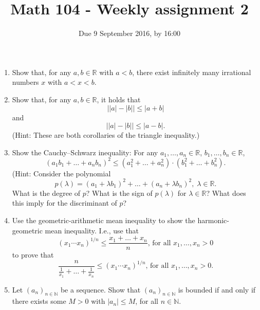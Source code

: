 \documentclass[11pt]{amsart}
\newcommand\R{{\mathbb{R}}}
\newcommand\N{{\mathbb N}}
\theoremstyle{plain}
\theoremstyle{definition}
\numberwithin{equation}{section}
\begin{document}
\title{Math 104 - Weekly assignment 2}
\author{Due 9 September 2016, by 16:00}
\maketitle

\begin{enumerate}
\item Show that, for any $a,b\in\R$ with $a<b$, there exist infinitely many irrational numbers $x$ with $a<x<b$.
\vspace{0.4in}
\item Show that, for any $a, b\in\R$, it holds that
$$\big| |a|-|b| \big|\leq |a+b|
$$
and 
$$\big| |a|-|b| \big|\leq |a-b|.
$$
(Hint: These are both corollaries of the triangle inequality.)
\vspace{0.4in}

\item Show the Cauchy--Schwarz inequality: For any $a_1,\ldots,a_n\in\R$, $b_1,\ldots,b_n\in\R$, 
$$(a_1b_1+\ldots+a_nb_n)^2\leq (a_1^2+\ldots +a_n^2)\cdot (b_1^2+\ldots +b_n^2).
$$
(Hint: Consider the polynomial 
$$p(\lambda)=(a_1+\lambda b_1)^2+\ldots +(a_n+\lambda b_n)^2,\; \lambda \in \R.
$$
What is the degree of $p$? What is the sign of $p(\lambda)$ for $\lambda\in\R$? What does this imply for the discriminant of $p$?
\vspace{0.4in}

\item Use the geometric-arithmetic mean inequality to show the harmonic-geometric mean inequality. I.e., use that
$$(x_1\cdots x_n)^{1/n}\leq \frac{x_1+\ldots+x_n}{n}\text{, for all }x_1,\ldots,x_n >0
$$
to prove that
$$\frac{n}{\frac{1}{x_1}+\ldots +\frac{1}{x_n}}\leq (x_1\cdots x_n)^{1/n}\text{, for all }x_1,\ldots,x_n>0.
$$
\vspace{0.4in}

\item Let $(a_n)_{n\in\N}$ be a sequence. Show that $(a_n)_{n\in\N}$ is bounded if and only if there exists some $M>0$ with $|a_n|\leq M$, for all $n\in \N$.
\vspace{0.4in}


\end{enumerate}
\end{document}
